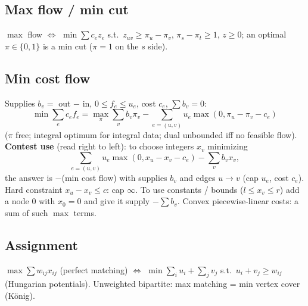 \subsection{Max flow / min cut}
$\max$ flow $\Leftrightarrow$ $\min \sum c_e z_e$ s.t.\ $z_{uv} \ge \pi_u - \pi_v$, $\pi_s - \pi_t \ge 1$, $z \ge 0$; an optimal $\pi \in \{0,1\}$ is a min cut ($\pi = 1$ on the $s$ side).

\subsection{Min cost flow}
Supplies $b_v = $ out $-$ in, $0 \le f_e \le u_e$, cost $c_e$, $\sum b_v = 0$:
\[ \min \sum_e c_e f_e = \max_{\pi} \sum_v b_v \pi_v - \sum_{e=(u,v)} u_e \max(0, \pi_u - \pi_v - c_e) \]
($\pi$ free; integral optimum for integral data; dual unbounded iff no feasible flow).
\textbf{Contest use} (read right to left): to choose integers $x_v$ minimizing
\[ \sum_{e=(u,v)} u_e \max(0, x_u - x_v - c_e) - \sum_v b_v x_v, \]
the answer is $-$(min cost flow) with supplies $b_v$ and edges $u \to v$ (cap $u_e$, cost $c_e$).
Hard constraint $x_u - x_v \le c$: cap $\infty$. To use constants / bounds ($l \le x_v \le r$) add a node $0$ with $x_0 = 0$ and give it supply $-\sum b_v$. Convex piecewise-linear costs: a sum of such $\max$ terms.

\subsection{Assignment}
$\max \sum w_{ij} x_{ij}$ (perfect matching) $\Leftrightarrow$ $\min \sum_i u_i + \sum_j v_j$ s.t.\ $u_i + v_j \ge w_{ij}$ (Hungarian potentials).
Unweighted bipartite: max matching = min vertex cover (König).

